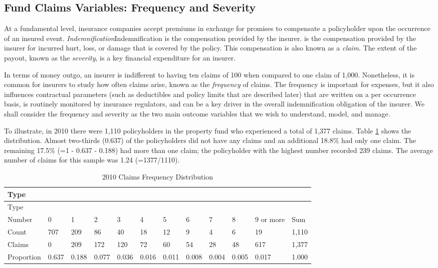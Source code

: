 \documentclass[]{book}
\theoremstyle{definition}
\theoremstyle{definition}
\theoremstyle{definition}
\theoremstyle{remark}
\begin{document}
\subsection{Fund Claims Variables: Frequency and
Severity}\label{S:OutComes}

At a fundamental level, insurance companies accept premiums in exchange
for promises to compensate a policyholder upon the occurrence of an
insured event. \emph{Indemnification}{Indemnification is the
compensation provided by the insurer.} is the compensation provided by
the insurer for incurred hurt, loss, or damage that is covered by the
policy. This compensation is also known as a \emph{claim}. The extent of
the payout, known as the \emph{severity}, is a key financial expenditure
for an insurer.

In terms of money outgo, an insurer is indifferent to having ten claims
of 100 when compared to one claim of 1,000. Nonetheless, it is common
for insurers to study how often claims arise, known as the
\emph{frequency} of claims. The frequency is important for expenses, but
it also influences contractual parameters (such as deductibles and
policy limits that are described later) that are written on a per
occurrence basis, is routinely monitored by insurance regulators, and
can be a key driver in the overall indemnification obligation of the
insurer. We shall consider the frequency and severity as the two main
outcome variables that we wish to understand, model, and manage.

To illustrate, in 2010 there were 1,110 policyholders in the property
fund who experienced a total of 1,377 claims. Table
\ref{tab:Frequency2010} shows the distribution. Almost two-thirds
(0.637) of the policyholders did not have any claims and an additional
18.8\% had only one claim. The remaining 17.5\% (=1 - 0.637 - 0.188) had
more than one claim; the policyholder with the highest number recorded
239 claims. The average number of claims for this sample was 1.24
(=1377/1110).

\begin{longtable}[]{@{}llllllllllll@{}}
\caption{\label{tab:Frequency2010} 2010 Claims Frequency
Distribution}\tabularnewline
\toprule
Type & & & & & & & & & & &\tabularnewline
\midrule
\endfirsthead
\toprule
Type & & & & & & & & & & &\tabularnewline
\midrule
\endhead
Number & 0 & 1 & 2 & 3 & 4 & 5 & 6 & 7 & 8 & 9 or more &
Sum\tabularnewline
Count & 707 & 209 & 86 & 40 & 18 & 12 & 9 & 4 & 6 & 19 &
1,110\tabularnewline
Claims & 0 & 209 & 172 & 120 & 72 & 60 & 54 & 28 & 48 & 617 &
1,377\tabularnewline
Proportion & 0.637 & 0.188 & 0.077 & 0.036 & 0.016 & 0.011 & 0.008 &
0.004 & 0.005 & 0.017 & 1.000\tabularnewline
\bottomrule
\end{longtable}
\end{document}
